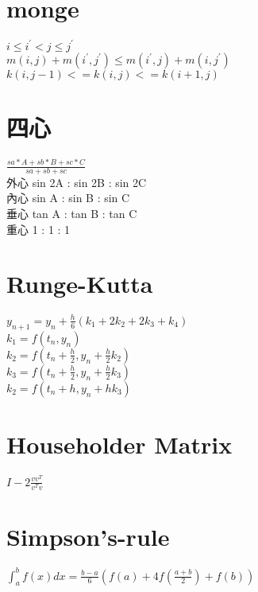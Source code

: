 \section{monge}
$i \leq i^{'} < j \leq j^{'}$ \\
$m(i,j)+m(i^{'},j^{'}) \leq m(i^{'},j)+m(i,j^{'})$ \\
$k(i,j-1)<=k(i,j)<=k(i+1,j)$

\section{四心}
$\frac{sa*A+sb*B+sc*C}{sa+sb+sc}$ \\
外心 sin 2A : sin 2B : sin 2C \\
內心 sin  A : sin  B : sin  C \\
垂心 tan  A : tan  B : tan  C \\
重心      1 :      1 :      1 

\section{Runge-Kutta}
$y_{n+1}=y_n+\frac{h}{6}(k_1+2k_2+2k_3+k_4)$\\
$k_1=f(t_n,y_n)$\\
$k_2=f(t_n+\frac{h}{2},y_n+\frac{h}{2}k_2)$\\
$k_3=f(t_n+\frac{h}{2},y_n+\frac{h}{2}k_3)$\\
$k_2=f(t_n+h,y_n+hk_3)$

\section{Householder Matrix}
$I-2\frac{vv^T}{v^Tv}$

\section{Simpson's-rule}
$\int_a^bf(x)dx=\frac{b-a}{6}(f(a)+4f(\frac{a+b}{2})+f(b))$
